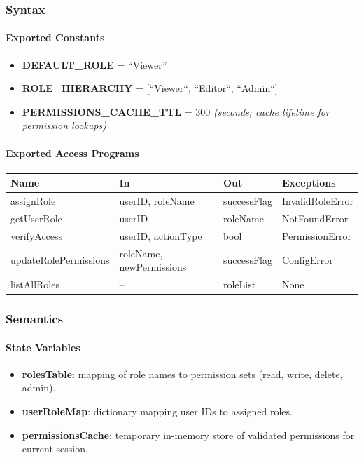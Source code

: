 \documentclass[12pt, titlepage]{article}
\begin{document}
\subsubsection{Syntax}

\paragraph{Exported Constants}
\begin{itemize}
  \item \textbf{DEFAULT\_ROLE} = ``Viewer''
  \item \textbf{ROLE\_HIERARCHY} = [``Viewer``, ``Editor``, ``Admin``]
  \item \textbf{PERMISSIONS\_CACHE\_TTL} = 300  \textit{(seconds; cache lifetime for permission lookups)}
\end{itemize}

\paragraph{Exported Access Programs}
\begin{center}
\renewcommand{\arraystretch}{1.2}
\begin{tabularx}{\textwidth}{l X X l}
\toprule
\textbf{Name} & \textbf{In} & \textbf{Out} & \textbf{Exceptions}\\
\midrule
assignRole & userID, roleName & successFlag & InvalidRoleError \\
getUserRole & userID & roleName & NotFoundError \\
verifyAccess & userID, actionType & bool & PermissionError \\
updateRolePermissions & roleName, newPermissions & successFlag & ConfigError \\
listAllRoles & -- & roleList & None \\
\bottomrule
\end{tabularx}
\end{center}

\subsubsection{Semantics}

\paragraph{State Variables}
\begin{itemize}
  \item \textbf{rolesTable}: mapping of role names to permission sets (read, write, delete, admin).
  \item \textbf{userRoleMap}: dictionary mapping user IDs to assigned roles.
  \item \textbf{permissionsCache}: temporary in-memory store of validated permissions for current session.
\end{itemize}
\end{document}
